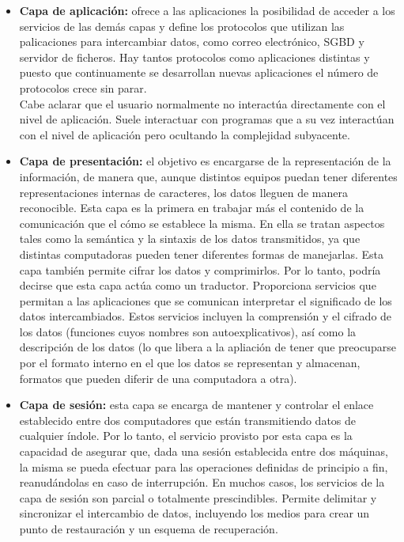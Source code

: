 \documentclass[a4paper,11pt]{article}
\begin{document}
\begin{itemize}
\item \textbf{Capa de aplicación:} ofrece a las aplicaciones la posibilidad de acceder a los servicios de las demás capas y define los protocolos que utilizan las palicaciones para intercambiar datos, como correo electrónico, SGBD y servidor de ficheros. Hay tantos protocolos como aplicaciones distintas y puesto que continuamente se desarrollan nuevas aplicaciones el número de protocolos crece sin parar. \\
Cabe aclarar que el usuario normalmente no interactúa directamente con el nivel de aplicación. Suele interactuar con programas que a su vez interactúan con el nivel de aplicación pero ocultando la complejidad subyacente.

\item \textbf{Capa de presentación:} el objetivo es encargarse de la representación de la información, de manera que, aunque distintos equipos puedan tener diferentes representaciones internas de caracteres, los datos lleguen de manera reconocible. Esta capa es la primera en trabajar más el contenido de la comunicación que el cómo se establece la misma. En ella se tratan aspectos tales como la semántica y la sintaxis de los datos transmitidos, ya que distintas computadoras pueden tener diferentes formas de manejarlas. Esta capa también permite cifrar los datos y comprimirlos. Por lo tanto, podría decirse que esta capa actúa como un traductor. Proporciona servicios que permitan a las  aplicaciones que se comunican interpretar el significado de los datos intercambiados. Estos servicios incluyen la comprensión y el cifrado de los datos (funciones cuyos nombres son autoexplicativos), así como la descripción de los datos (lo que libera a la apliación de tener que preocuparse por el formato interno en el que los datos se representan y almacenan, formatos que pueden diferir de una computadora a otra).

\item \textbf{Capa de sesión:} esta capa se encarga de mantener y controlar el enlace establecido entre dos computadores que están transmitiendo datos de cualquier índole. Por lo tanto, el servicio provisto por esta capa es la capacidad de asegurar que, dada una sesión establecida entre dos máquinas, la misma se pueda efectuar para las operaciones definidas de principio a fin, reanudándolas en caso de interrupción. En muchos casos, los servicios de la capa de sesión son parcial o totalmente prescindibles. Permite delimitar y sincronizar el intercambio de datos, incluyendo los medios para crear un punto de restauración y un esquema de recuperación.


\end{itemize}
\end{document}
